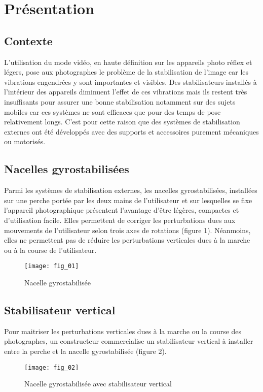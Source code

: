 \section{Présentation}
\subsection{Contexte}
L'utilisation du mode vidéo, en haute définition sur les appareils photo réflex et légers, pose aux photographes le problème de la stabilisation de l'image car les vibrations engendrées y sont importantes et visibles. Des stabilisateurs installés à l'intérieur des appareils diminuent l'effet de ces vibrations mais ils restent très insuffisants pour assurer une bonne stabilisation notamment sur des sujets mobiles car ces systèmes ne sont efficaces que pour des temps de pose relativement longs. C'est pour cette raison que des systèmes de stabilisation externes ont été développés avec des supports et accessoires purement mécaniques ou motorisés.

\subsection{Nacelles gyrostabilisées}
Parmi les systèmes de stabilisation externes, les nacelles gyrostabilisées, installées sur une perche portée par les deux mains de l'utilisateur et sur lesquelles se fixe l'appareil photographique présentent l'avantage d'être légères, compactes et d'utilisation facile. Elles permettent de corriger les perturbations dues aux mouvements de l'utilisateur selon trois axes de rotations (figure 1). Néanmoins, elles ne permettent pas de réduire les perturbations verticales dues à la marche ou à la course de l'utilisateur.

\begin{figure}[H]
\centering
\texttt{[image: fig\_01]}
\caption{\label{fig:01} Nacelle gyrostabilisée}
\end{figure}


\subsection{Stabilisateur vertical}
Pour maitriser les perturbations verticales dues à la marche ou la course des photographes, un constructeur commercialise un stabilisateur vertical à installer entre la perche et la nacelle gyrostabilisée (figure 2).

\begin{figure}[H]
\centering
\texttt{[image: fig\_02]}
\caption{\label{fig:02} Nacelle gyrostabilisée avec stabilisateur vertical}
\end{figure}


